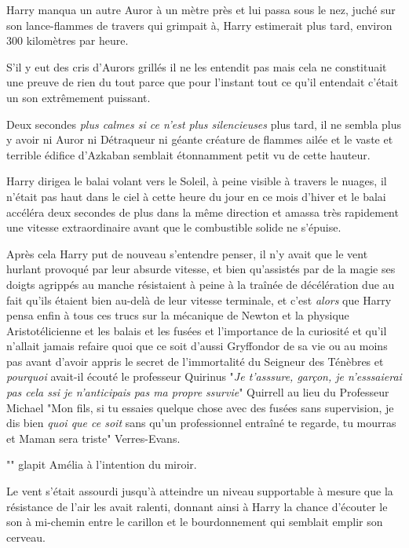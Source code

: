 Harry manqua un autre Auror à un mètre près et lui passa sous le nez, juché sur son lance-flammes de travers qui grimpait à, Harry estimerait plus tard, environ 300 kilomètres par heure.

S'il y eut des cris d'Aurors grillés il ne les entendit pas mais cela ne constituait une preuve de rien du tout parce que pour l'instant tout ce qu'il entendait c'était un son extrêmement puissant.

Deux secondes \emph{plus calmes si ce n'est plus silencieuses} plus tard, il ne sembla plus y avoir ni Auror ni Détraqueur ni géante créature de flammes ailée et le vaste et terrible édifice d'Azkaban semblait étonnamment petit vu de cette hauteur.

Harry dirigea le balai volant vers le Soleil, à peine visible à travers le nuages, il n'était pas haut dans le ciel à cette heure du jour en ce mois d'hiver et le balai accéléra deux secondes de plus dans la même direction et amassa très rapidement une vitesse extraordinaire avant que le combustible solide ne s'épuise.

Après cela Harry put de nouveau s'entendre penser, il n'y avait que le vent hurlant provoqué par leur absurde vitesse, et bien qu'assistés par de la magie ses doigts agrippés au manche résistaient à peine à la traînée de décélération due au fait qu'ils étaient bien au-delà de leur vitesse terminale, et c'est \emph{alors} que Harry pensa enfin à tous ces trucs sur la mécanique de Newton et la physique Aristotélicienne et les balais et les fusées et l'importance de la curiosité et qu'il n'allait jamais refaire quoi que ce soit d'aussi Gryffondor de sa vie ou au moins pas avant d'avoir appris le secret de l'immortalité du Seigneur des Ténèbres et \emph{pourquoi} avait-il écouté le professeur Quirinus "\emph{Je t'asssure, garçon, je n'esssaierai pas cela ssi je n'anticipais pas ma propre ssurvie}" Quirrell au lieu du Professeur Michael "Mon fils, si tu essaies quelque chose avec des fusées sans supervision, je dis bien \emph{quoi que ce soit} sans qu'un professionnel entraîné te regarde, tu mourras et Maman sera triste" Verres-Evans.

\later

"" glapit Amélia à l'intention du miroir.

\later

Le vent s'était assourdi jusqu'à atteindre un niveau supportable à mesure que la résistance de l'air les avait ralenti, donnant ainsi à Harry la chance d'écouter le son à mi-chemin entre le carillon et le bourdonnement qui semblait emplir son cerveau.

